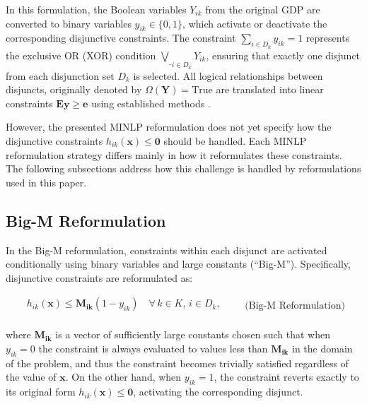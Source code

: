 \documentclass[11pt]{article}
\begin{document}
In this formulation, the Boolean variables  \(Y_{ik}\) from the original GDP are converted to binary variables $y_{ik}\in\{0,1\}$, which activate or deactivate the corresponding disjunctive constraints.
The constraint $\sum_{i \in D_k} y_{ik}=1$ represents the exclusive OR (XOR) condition \(\underset{i \in D_k}{\underline{\bigvee}} Y_{ik}\), ensuring that exactly one disjunct from each disjunction set \( D_k\) is selected.
All logical relationships between disjuncts, originally denoted by \( \Omega(\mathbf{Y}) = \text{True}\) are translated into linear constraints \(\mathbf{E} \mathbf{y} \geq \mathbf{e}\) using established methods \cite{grossmannSystematicModelingDiscretecontinuous2013}.

However, the presented MINLP reformulation does not yet specify how the disjunctive constraints \( h_{ik}(\mathbf{x}) \leq \mathbf{0}\) should be handled.
Each MINLP reformulation strategy differs mainly in how it reformulates these constraints.
The following subsections address how this challenge is handled by reformulations used in this paper.


\subsection{Big-M Reformulation}


In the Big-M reformulation, constraints within each disjunct are activated conditionally using binary variables and large constants (``Big-M'')\cite{trespalaciosReviewMixedIntegerNonlinear2014}. Specifically, disjunctive constraints are reformulated as:

\begingroup
\begin{equation}
\begin{aligned}
    h_{ik}(\mathbf{x}) \leq \mathbf{M_{ik}}(1 - y_{ik})
        \quad \forall\, k \in K,\, i \in D_k, \\
\end{aligned}
\qquad \text{(Big-M Reformulation)}
\end{equation}
\endgroup

\noindent where \(\mathbf{M_{ik}}\) is a vector of sufficiently large constants chosen such that when $y_{ik}=0$ the constraint is always evaluated to values less than $\mathbf{M_{ik}}$ in the domain of the problem, and thus the constraint becomes trivially satisfied regardless of the value of $\mathbf{x}$.
On the other hand, when $y_{ik}=1$, the constraint reverts exactly to its original form $h_{ik}(\mathbf{x})\leq \mathbf{0}$, activating the corresponding disjunct.
\end{document}
